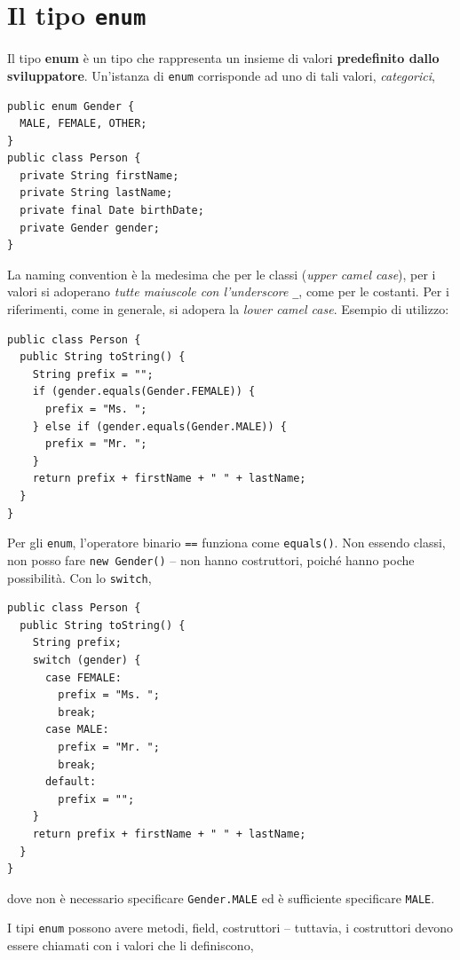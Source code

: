 \documentclass[\fontsizeclass,twocolumn]{\classname}
\theoremstyle{definition}
\theoremstyle{definition}
\begin{document}
\section{Il tipo \texttt{enum}}

Il tipo \textbf{enum} è un tipo che rappresenta un insieme di valori
\textbf{predefinito dallo sviluppatore}. Un'istanza di \texttt{enum}
corrisponde ad uno di tali valori, \emph{categorici},

\begin{lstlisting}
public enum Gender {
  MALE, FEMALE, OTHER;
}
public class Person {
  private String firstName;
  private String lastName;
  private final Date birthDate;
  private Gender gender;
}
\end{lstlisting}

La naming convention è la medesima che per le classi (\emph{upper camel case}),
per i valori si adoperano \emph{tutte maiuscole con l'underscore} \texttt{\_},
come per le costanti. Per i riferimenti, come in generale, si adopera la
\emph{lower camel case}. Esempio di utilizzo:

\begin{lstlisting}
public class Person {
  public String toString() {
    String prefix = "";
    if (gender.equals(Gender.FEMALE)) {
      prefix = "Ms. ";
    } else if (gender.equals(Gender.MALE)) {
      prefix = "Mr. ";
    }
    return prefix + firstName + " " + lastName;
  }
}
\end{lstlisting}

Per gli \texttt{enum}, l'operatore binario \texttt{==} funziona come
\texttt{equals()}. Non essendo classi, non posso fare \texttt{new Gender()} --
non hanno costruttori, poiché hanno poche possibilità. Con lo \texttt{switch},

\begin{lstlisting}
public class Person {
  public String toString() {    
    String prefix;
    switch (gender) {
      case FEMALE:
        prefix = "Ms. ";
        break;
      case MALE:
        prefix = "Mr. ";
        break;
      default:
        prefix = "";
    }
    return prefix + firstName + " " + lastName;
  }
}
\end{lstlisting}

dove non è necessario specificare \texttt{Gender.MALE} ed è sufficiente
specificare \texttt{MALE}.

I tipi \texttt{enum} possono avere metodi, field, costruttori -- tuttavia, i
costruttori devono essere chiamati con i valori che li definiscono,
\end{document}
